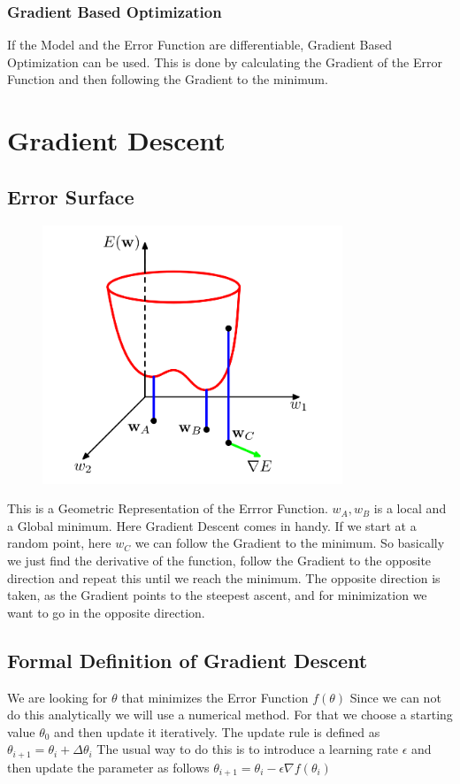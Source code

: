 \documentclass[a4paper]{article}
\begin{document}
\subsubsection{Gradient Based Optimization}
If the Model and the Error Function are differentiable, Gradient Based Optimization can be used. This is done by calculating the Gradient of the Error Function and then following the Gradient to the minimum.

\section{Gradient Descent}
\subsection{Error Surface}

\begin{figure}[h]
    \centering
    \includegraphics[width=0.8\textwidth]{images/error_surface.png}
    \caption{}
    \label{fig:Error Surface}
\end{figure}

This is a Geometric Representation of the Errror Function. $w_{A} , w_{B}$ is a local and a Global minimum. Here Gradient Descent comes in handy. If we start at a random point, here $w_{C}$ we can follow the Gradient to the minimum. So basically we just find the derivative of the function, follow the Gradient to the opposite direction and repeat this until we reach the minimum. The opposite direction is taken, as the Gradient points to the steepest ascent, and for minimization we want to go in the opposite direction.

\subsection{Formal Definition of Gradient Descent}
We are looking for $\theta$ that minimizes the Error Function $f(\theta)$ Since we can not do this analytically we will use a numerical method.  For that we choose a starting value $\theta_{0}$ and then update it iteratively. The update rule is defined as $\theta_{i+1} = \theta_{i} + \Delta \theta_{i}$ 
The usual way to do this is to introduce a learning rate $\epsilon$ and then update the parameter as follows $\theta_{i+1} = \theta_{i} - \epsilon \nabla f(\theta_{i})$
\end{document}
